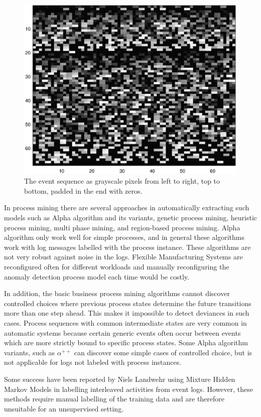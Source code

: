 \documentclass[journal]{IEEEtran}
\begin{document}
\begin{figure}[tb]
 \centering
 \includegraphics[width=8 cm,keepaspectratio=true]{./color_vis.eps}
 \caption{The event sequence as grayscale pixels from left to right, top to bottom, padded in the end with zeros.}
 \label{figure:color_vis}
\end{figure}

In process mining there are several approaches in automatically extracting such models such as Alpha algorithm and its 
variants, genetic process mining, heuristic process mining, multi phase mining, and region-based process mining. Alpha algorithm only work well for simple processes,
and in general these algorithms work with log messages labelled with the process instance. These algorithms are not very robust against noise in the logs.
Flexible Manufacturing Systems are reconfigured often for different workloads and manually reconfiguring the anomaly
detection process model each time would be costly.

In addition, the basic business process mining algorithms cannot discover controlled choices where previous process states
determine the future transitions more than one step ahead. This makes it impossible to detect deviances in such cases. Process sequences with common intermediate states
are very common in automatic systems because certain generic events often occur between events which are more strictly bound to specific process states. Some Alpha algorithm
variants, such as $\alpha^{++}$ \cite{wen2007mining} can discover some simple cases of controlled choice, but is not applicable for logs not labeled with process instances.

Some success have been reported by Niels Landwehr using Mixture Hidden Markov Models \cite{landwehr2008modeling} in labelling interleaved activities from event logs.
However, these methods require manual labelling of the training data and are therefore unsuitable for an unsupervised setting.
\end{document}
